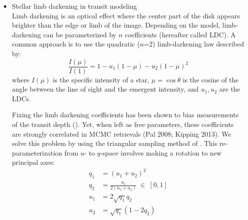 \begin{itemize}
\item Stellar limb darkening in transit modeling\\
Limb darkening is an optical effect where the center part of the disk appears brighter than the edge or limb of the image. Depending on the model, limb-darkening can be parameterized by $n$ coefficients (hereafter called LDC). A common approach is to use the quadratic ($n$=2) limb-darkening law %
described by:
\begin{equation}
\frac{I(\mu)}{I(1)} = 1 − u_1(1 − \mu) − u_2(1 − \mu)^2
\end{equation}
where $I(\mu)$ is the specific intensity of a star, $\mu=\cos \theta$ is the cosine of the angle between the line of sight and the emergent intensity, and $u_1, u_2$ are the LDCs.


Fixing the limb darkening coefficients has been shown to bias measurements of the transit depth (\cite{Espinoza2015}). Yet, when left as free parameters, these coefficients are strongly correlated in MCMC retrievals (Pal 2008; Kipping 2013). 
We solve this problem by using the triangular sampling method of \cite{Kipping2013}. This re-parameterization from $u$- to $q$-space involves making a rotation to new principal axes:
\begin{align}
q_1 &= (u_1+u_2)^2\\
q_2 &= \frac{u_1}{2(u_1+u_2)} \; \in \; [0,1] \\
u_1& = 2\sqrt{q_1}q_2 \\
u_2& = \sqrt{q_1}(1-2q_2)
\end{align}


\end{itemize}
